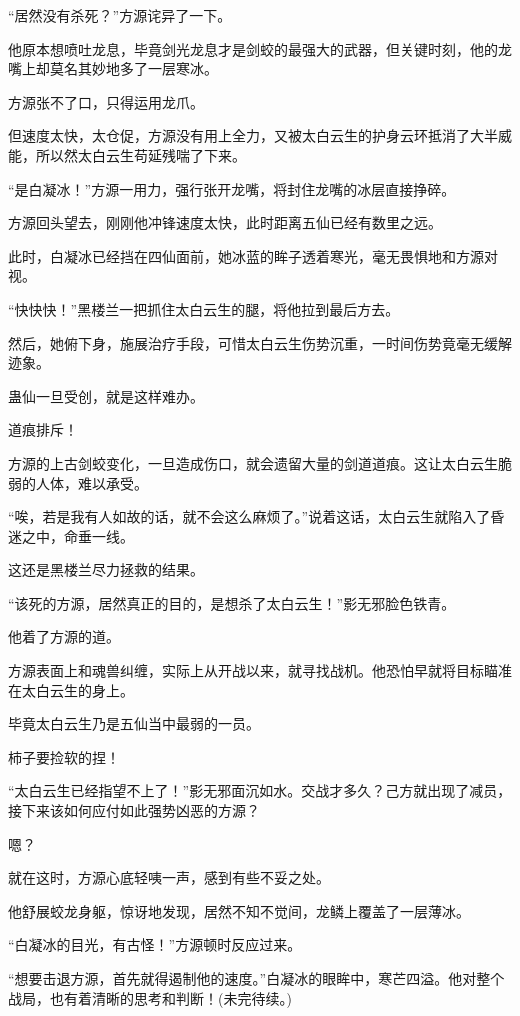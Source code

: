 \begin{this_body}
“居然没有杀死？”方源诧异了一下。

他原本想喷吐龙息，毕竟剑光龙息才是剑蛟的最强大的武器，但关键时刻，他的龙嘴上却莫名其妙地多了一层寒冰。

方源张不了口，只得运用龙爪。

但速度太快，太仓促，方源没有用上全力，又被太白云生的护身云环抵消了大半威能，所以然太白云生苟延残喘了下来。

“是白凝冰！”方源一用力，强行张开龙嘴，将封住龙嘴的冰层直接挣碎。

方源回头望去，刚刚他冲锋速度太快，此时距离五仙已经有数里之远。

此时，白凝冰已经挡在四仙面前，她冰蓝的眸子透着寒光，毫无畏惧地和方源对视。

“快快快！”黑楼兰一把抓住太白云生的腿，将他拉到最后方去。

然后，她俯下身，施展治疗手段，可惜太白云生伤势沉重，一时间伤势竟毫无缓解迹象。

蛊仙一旦受创，就是这样难办。

道痕排斥！

方源的上古剑蛟变化，一旦造成伤口，就会遗留大量的剑道道痕。这让太白云生脆弱的人体，难以承受。

“唉，若是我有人如故的话，就不会这么麻烦了。”说着这话，太白云生就陷入了昏迷之中，命垂一线。

这还是黑楼兰尽力拯救的结果。

“该死的方源，居然真正的目的，是想杀了太白云生！”影无邪脸色铁青。

他着了方源的道。

方源表面上和魂兽纠缠，实际上从开战以来，就寻找战机。他恐怕早就将目标瞄准在太白云生的身上。

毕竟太白云生乃是五仙当中最弱的一员。

柿子要捡软的捏！

“太白云生已经指望不上了！”影无邪面沉如水。交战才多久？己方就出现了减员，接下来该如何应付如此强势凶恶的方源？

嗯？

就在这时，方源心底轻咦一声，感到有些不妥之处。

他舒展蛟龙身躯，惊讶地发现，居然不知不觉间，龙鳞上覆盖了一层薄冰。

“白凝冰的目光，有古怪！”方源顿时反应过来。

“想要击退方源，首先就得遏制他的速度。”白凝冰的眼眸中，寒芒四溢。他对整个战局，也有着清晰的思考和判断！(未完待续。)

\end{this_body}

